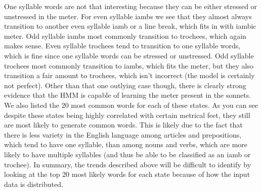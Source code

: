 \begin{itemize}
    One syllable words are not that interesting because they can be either stressed
    or unstressed in the meter. For even syllable iambs we see that they almost always
    transition to another even syllable iamb or a line break, which fits in with
    iambic meter. Odd syllable iambs most commonly transition to trochees, which
    again makes sense. Even syllable trochees tend to transition to one syllable 
    words, which is fine since one syllable words can be stressed or unstressed.
    Odd syllable trochees most commonly transition to iambs, which fits the meter,
    but they also transition a fair amount to trochees, which isn't incorrect
    (the model is certainly not perfect). Other than that one outlying case though,
    there is clearly strong evidence that the HMM is capable of learning the
    meter present in the sonnets. \\

    We also listed the 20 most common words for each of these states. As you can see despite these states being highly correlated with certain metrical feet, they still are most likely to generate common words. This is likely due to
    the fact that there is less variety in the English language among articles
    and prepositions, which tend to have one syllable, than among nouns and
    verbs, which are more likely to have multiple syllables (and thus be able
    to be classified as an iamb or trochee). In summary, the trends described
    above will be difficult to identify by looking at the top 20 most likely words
    for each state because of how the input data is distributed.


\end{itemize}
